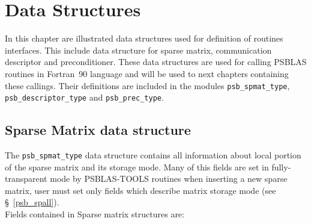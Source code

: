 \section{Data Structures}
\label{sec:datastruct}

In this chapter are illustrated data structures used for definition of
routines interfaces. This include data structure for sparse matrix,
communication descriptor and preconditioner. These data structures are used for
calling PSBLAS routines in Fortran~90 language and will be used to next
chapters containing these callings. Their definitions are included in
the modules \verb|psb_spmat_type|, \verb|psb_descriptor_type| and \verb|psb_prec_type|. 

\subsection{Sparse Matrix data structure}
\label{sec:spmat}
The \hypertarget{spdata}{{\tt psb\_spmat\_type}} data structure
contains all information about local portion of the sparse matrix and   
its storage mode. Many of this fields are set in fully-transparent
mode by PSBLAS-TOOLS routines when inserting a new sparse matrix, user
must set only fields which describe matrix storage mode (see
\S~\ref{psb_spall}). \\
Fields contained in Sparse matrix structures are:
